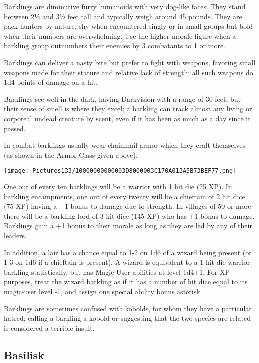 \documentclass[a4paper,twoside,openany,10pt]{book}
\begin{document}
\begin{multicols}{2}
Barklings are diminutive furry humanoids with very dog-like faces. They stand between 2½ and 3½ feet tall and typically weigh around 45 pounds. They are pack hunters by nature, shy when encountered singly or in small groups but bold when their numbers are overwhelming. Use the higher morale figure when a barkling group outnumbers their enemies by 3 combatants to 1 or more.

Barklings can deliver a nasty bite but prefer to fight with weapons, favoring small weapons made for their stature and relative lack of strength; all such weapons do 1d4 points of damage on a hit. 

Barklings see well in the dark, having Darkvision with a range of 30 feet, but their sense of smell is where they excel; a barkling can track almost any living or corporeal undead creature by scent, even if it has been as much as a day since it passed.

In combat barklings usually wear chainmail armor which they craft themselves (as shown in the Armor Class given above).


\begin{center}
	\texttt{[image: Pictures133/10000000000003D8000003C170A013A5B73BEF77.png]}
\end{center}


One out of every ten barklings will be a warrior with 1 hit die (25 XP). In barkling encampments, one out of every twenty will be a chieftain of 2 hit dice (75 XP) having a +1 bonus to damage due to strength. In villages of 50 or more there will be a barkling lord of 3 hit dice (145 XP) who has +1 bonus to damage. Barklings gain a +1 bonus to their morale as long as they are led by any of their leaders.

In addition, a lair has a chance equal to 1-2 on 1d6 of a wizard being present (or 1-3 on 1d6 if a chieftain is present). A wizard is equivalent to a 1 hit die warrior barkling statistically, but has Magic-User abilities at level 1d4+1. For XP purposes, treat the wizard barkling as if it has a number of hit dice equal to its magic-user level ‑1, and assign one special ability bonus asterisk.

Barklings are sometimes confused with kobolds, for whom they have a particular hatred; calling a barkling a kobold or suggesting that the two species are related is considered a terrible insult.\\

\subsection*{Basilisk}\label{basilisk}


\end{multicols}
\end{document}
